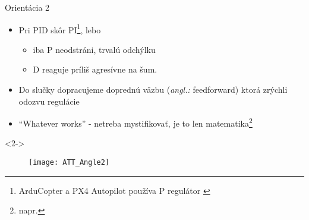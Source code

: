 \documentclass{beamer}
\newcommand{\angl}[1]{{\color{gray}(\emph{angl.:} #1)}}
\begin{document}
    \begin{frame}[t]{Orientácia 2}
\begin{itemize}
  \item<1-> Pri PID skôr PI\footnote{ArduCopter a PX4 Autopilot používa P regulátor \citep{PX4:PID,AP:PIDDOC}}, lebo
  \begin{itemize}
            \item iba P neodstráni, trvalú odchýlku
            \item D reaguje príliš agresívne na šum.
  \end{itemize}
      \item<2-> Do slučky dopracujeme doprednú väzbu \angl{feedforward} ktorá zrýchli odozvu regulácie
      \item<3-> ``Whatever works'' - netreba mystifikovať, je to len matematika\footnote{napr. }
  \end{itemize}


  \begin{onlyenv}<2->
\begin{figure}
\centering
  \texttt{[image: ATT\_Angle2]}\\
\end{figure}
\end{onlyenv}

  \end{frame}
\end{document}

